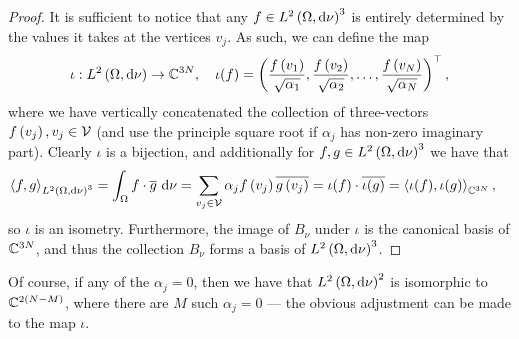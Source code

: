 \begin{proof}
	It is sufficient to notice that any $f\in L^{2}\left( \Omega,\mathrm{d}\nu \right)^3$ is entirely determined by the values it takes at the vertices $v_j$.
	As such, we can define the map
	\begin{align*}
		\iota:L^{2}\left( \Omega,\mathrm{d}\nu \right) \rightarrow \mathbb{C}^{3N}, \quad
		\iota(f) = \left( \frac{f\left( v_1 \right)}{\sqrt{\alpha_1}}, \frac{f\left( v_2 \right)}{\sqrt{\alpha_2}}, \hdots, \frac{f\left( v_N \right)}{\sqrt{\alpha_N}} \right)^\top,
	\end{align*}
	where we have vertically concatenated the collection of three-vectors $f\left( v_j \right), v_j\in\mathcal{V}$ 	(and use the principle square root if $\alpha_j$ has non-zero imaginary part).
	Clearly $\iota$ is a bijection, and additionally for $f,g\in L^{2}\left( \Omega,\mathrm{d}\nu \right)^3$ we have that
	\begin{align*}
		\left\langle f , g \right\rangle_{L^{2}\left( \Omega,\mathrm{d}\nu \right)^3} &= \int_{\Omega}f\cdot\overline{g} \ \mathrm{d}\nu
		= \sum_{v_j\in\mathcal{V}}\alpha_j f\left( v_j \right)\overline{g\left( v_j \right)}
		= \iota(f)\cdot\overline{\iota(g)}
		= \left\langle \iota(f) , \iota(g) \right\rangle_{\mathbb{C}^{3N}},
	\end{align*}
	so $\iota$ is an isometry.
	Furthermore, the image of $B_{\nu}$ under $\iota$ is the canonical basis of $\mathbb{C}^{3N}$, and thus the collection $B_{\nu}$ forms a basis of $L^{2}\left( \Omega,\mathrm{d}\nu \right)^3$.
\end{proof}
Of course, if any of the $\alpha_j=0$, then we have that $L^{2}\left( \Omega,\mathrm{d}\nu \right)^2$ is isomorphic to $\mathbb{C}^{2(N-M)}$, where there are $M$ such $\alpha_j=0$ --- the obvious adjustment can be made to the map $\iota$.

